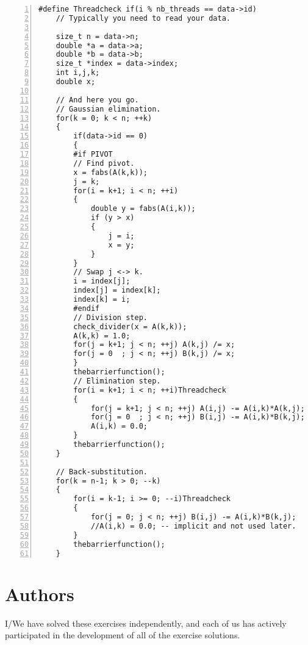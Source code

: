 \documentclass{article}
\begin{document}
\begin{lstlisting}[basicstyle=\small\sffamily,
keywords={break,case,const,continue,default,else,enum,
for,if,return,switch,while,do,long,void,int,float,double,
char,struct,typedef,include,size\_t},
keywordstyle={\color{blue}},
comment={[l]{//}}, morecomment={[s]{/*}{*/}}, commentstyle=\itshape,
columns={[l]flexible}, numbers=left, numberstyle=\tiny,
frameround=fftt, frame=shadowbox, captionpos=b,
caption={Matrix inversion with barriers.},
label=LST:invmat2]
#define Threadcheck if(i % nb_threads == data->id)
    // Typically you need to read your data.

    size_t n = data->n;
    double *a = data->a;
    double *b = data->b;
    size_t *index = data->index;
    int i,j,k;
    double x;

    // And here you go.
	// Gaussian elimination.
    for(k = 0; k < n; ++k)
    {
		if(data->id == 0)
		{
		#if PIVOT
        // Find pivot.
        x = fabs(A(k,k));
        j = k;
        for(i = k+1; i < n; ++i)
        {
            double y = fabs(A(i,k));
            if (y > x)
            {
                j = i;
                x = y;
            }
        }
        // Swap j <-> k.
        i = index[j];
        index[j] = index[k];
        index[k] = i;
		#endif
        // Division step.
        check_divider(x = A(k,k));
        A(k,k) = 1.0;
        for(j = k+1; j < n; ++j) A(k,j) /= x;
        for(j = 0  ; j < n; ++j) B(k,j) /= x;
		}
		thebarrierfunction();
        // Elimination step.
        for(i = k+1; i < n; ++i)Threadcheck
        {
            for(j = k+1; j < n; ++j) A(i,j) -= A(i,k)*A(k,j);
            for(j = 0  ; j < n; ++j) B(i,j) -= A(i,k)*B(k,j);
            A(i,k) = 0.0;
        }
		thebarrierfunction();
    }

    // Back-substitution.
    for(k = n-1; k > 0; --k)
    {
        for(i = k-1; i >= 0; --i)Threadcheck
        {
            for(j = 0; j < n; ++j) B(i,j) -= A(i,k)*B(k,j);
            //A(i,k) = 0.0; -- implicit and not used later.
        }
		thebarrierfunction();
    }
\end{lstlisting}


\newpage
\section{Authors}
I/We have solved these exercises independently, and each of us has actively
participated in the development of all of the exercise solutions.
\vspace{1cm}
\end{document}
